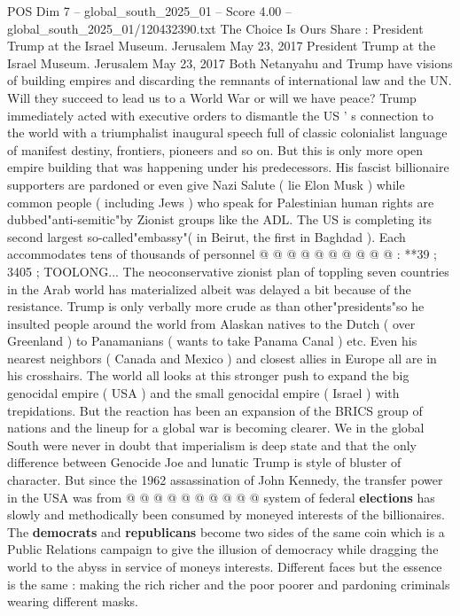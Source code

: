 \begin{textsample}{POS Dim 7 – global\_south\_2025\_01 – Score 4.00 – global\_south\_2025\_01/120432390.txt}  \label{ex:f7_pos_345}
The Choice Is Ours Share : President Trump at the Israel Museum.
Jerusalem May 23, 2017 President Trump at the Israel Museum.
Jerusalem May 23, 2017 Both Netanyahu and Trump have visions of building empires and discarding the remnants of international law and the UN.
Will they succeed to lead us to a World War or will we have peace?
Trump immediately acted with executive orders to dismantle the US ' s connection to the world with a triumphalist inaugural speech full of classic colonialist language of manifest destiny, frontiers, pioneers and so on.
But this is only more open empire building that was happening under his predecessors.
His fascist billionaire supporters are pardoned or even give Nazi Salute ( lie Elon Musk ) while common people ( including Jews ) who speak for Palestinian human rights are dubbed"anti-semitic"by Zionist groups like the ADL.
The US is completing its second largest so-called"embassy"( in Beirut, the first in Baghdad ).
Each accommodates tens of thousands of personnel @ @ @ @ @ @ @ @ @ @ : **39 ; 3405 ; TOOLONG...
The neoconservative zionist plan of toppling seven countries in the Arab world has materialized albeit was delayed a bit because of the resistance.
Trump is only verbally more crude as than other"presidents"so he insulted people around the world from Alaskan natives to the Dutch ( over Greenland ) to Panamanians ( wants to take Panama Canal ) etc.
Even his nearest neighbors ( Canada and Mexico ) and closest allies in Europe all are in his crosshairs.
The world all looks at this stronger push to expand the big genocidal empire ( USA ) and the small genocidal empire ( Israel ) with trepidations.
But the reaction has been an expansion of the BRICS group of nations and the lineup for a global war is becoming clearer.
We in the global South were never in doubt that imperialism is deep state and that the only difference between Genocide Joe and lunatic Trump is style of bluster of character.
But since the 1962 assassination of John Kennedy, the transfer power in the USA was from @ @ @ @ @ @ @ @ @ @ system of federal \textbf{elections} has slowly and methodically been consumed by moneyed interests of the billionaires.
The \textbf{democrats} and \textbf{republicans} become two sides of the same coin which is a Public Relations campaign to give the illusion of democracy while dragging the world to the abyss in service of moneys interests.
Different faces but the essence is the same : making the rich richer and the poor poorer and pardoning criminals wearing different masks.

\end{textsample}
